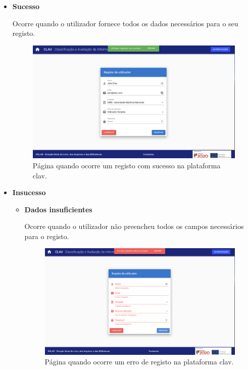 \begin{itemize}
    \item \textbf{Sucesso}
    
    Ocorre quando o utilizador fornece todos os dados necessários para o seu registo.
    
    \begin{figure}[h!]
        \centering
        \includegraphics[width=\textwidth]{img/clav/authlocal/sucessoRegisto.png}
        \caption{Página quando ocorre um registo com sucesso na plataforma \gls{clav}.}
        \label{fig:registoSucesso}
    \end{figure}
    
    \item \textbf{Insucesso}
    
    \begin{itemize}
        \item \textbf{Dados insuficientes}
        
        Ocorre quando o utilizador não preencheu todos os campos necessários para o registo.
        
        \begin{figure}[h!]
            \centering
            \includegraphics[width=\textwidth]{img/clav/authlocal/erroRegisto1.png}
            \caption{Página quando ocorre um erro de registo na plataforma \gls{clav}.}
            \label{fig:registoErro1}
        \end{figure}


\end{itemize}
\end{itemize}
